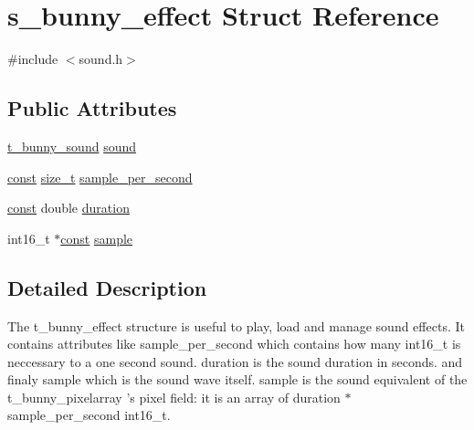 \hypertarget{structs__bunny__effect}{\section{s\-\_\-bunny\-\_\-effect Struct Reference}
\label{structs__bunny__effect}
}


{\ttfamily \#include $<$sound.\-h$>$}

\subsection*{Public Attributes}
\begin{DoxyCompactItemize}
\item 
\hyperlink{sound_8h_af5566812e76e3d6b601768a24d114a14}{t\-\_\-bunny\-\_\-sound} \hyperlink{structs__bunny__effect_a7bdb04c4b5e7a9f2819dc9fdd44c1682}{sound}
\item 
\hyperlink{term__entry_8h_a57bd63ce7f9a353488880e3de6692d5a}{const} \hyperlink{nc__alloc_8h_a7b60c5629e55e8ec87a4547dd4abced4}{size\-\_\-t} \hyperlink{structs__bunny__effect_a81d7eb8e57b6dd5a8a0ad8638fdc35ff}{sample\-\_\-per\-\_\-second}
\item 
\hyperlink{term__entry_8h_a57bd63ce7f9a353488880e3de6692d5a}{const} double \hyperlink{structs__bunny__effect_ae7b38147c77defa25b4f26d5c4ac1eb0}{duration}
\item 
int16\-\_\-t $\ast$\hyperlink{term__entry_8h_a57bd63ce7f9a353488880e3de6692d5a}{const} \hyperlink{structs__bunny__effect_ae4f9bef6b6a6017a1109a67d2aeb962a}{sample}
\end{DoxyCompactItemize}


\subsection{Detailed Description}
The t\-\_\-bunny\-\_\-effect structure is useful to play, load and manage sound effects. It contains attributes like sample\-\_\-per\-\_\-second which contains how many int16\-\_\-t is neccessary to a one second sound. duration is the sound duration in seconds. and finaly sample which is the sound wave itself. sample is the sound equivalent of the t\-\_\-bunny\-\_\-pixelarray 's pixel field\-: it is an array of duration $\ast$ sample\-\_\-per\-\_\-second int16\-\_\-t. 

